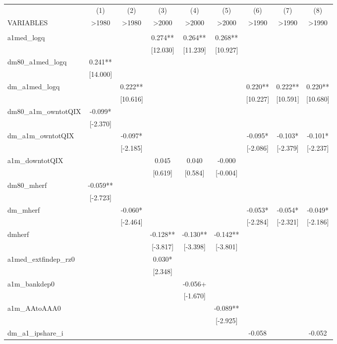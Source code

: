 \documentclass[]{article}
\begin{document}
\begin{tabular}{lcccccccc} \hline
 & (1) & (2) & (3) & (4) & (5) & (6) & (7) & (8) \\
VARIABLES & >1980 & >1980 & >2000 & >2000 & >2000 & >1990 & >1990 & >1990 \\ \hline
 &  &  &  &  &  &  &  &  \\
a1med\_logq &  &  & 0.274** & 0.264** & 0.268** &  &  &  \\
 &  &  & [12.030] & [11.239] & [10.927] &  &  &  \\
dm80\_a1med\_logq & 0.241** &  &  &  &  &  &  &  \\
 & [14.000] &  &  &  &  &  &  &  \\
dm\_a1med\_logq &  & 0.222** &  &  &  & 0.220** & 0.222** & 0.220** \\
 &  & [10.616] &  &  &  & [10.227] & [10.591] & [10.680] \\
dm80\_a1m\_owntotQIX & -0.099* &  &  &  &  &  &  &  \\
 & [-2.370] &  &  &  &  &  &  &  \\
dm\_a1m\_owntotQIX &  & -0.097* &  &  &  & -0.095* & -0.103* & -0.101* \\
 &  & [-2.185] &  &  &  & [-2.086] & [-2.379] & [-2.237] \\
a1m\_downtotQIX &  &  & 0.045 & 0.040 & -0.000 &  &  &  \\
 &  &  & [0.619] & [0.584] & [-0.004] &  &  &  \\
dm80\_mherf & -0.059** &  &  &  &  &  &  &  \\
 & [-2.723] &  &  &  &  &  &  &  \\
dm\_mherf &  & -0.060* &  &  &  & -0.053* & -0.054* & -0.049* \\
 &  & [-2.464] &  &  &  & [-2.284] & [-2.321] & [-2.186] \\
dmherf &  &  & -0.128** & -0.130** & -0.142** &  &  &  \\
 &  &  & [-3.817] & [-3.398] & [-3.801] &  &  &  \\
a1med\_extfindep\_rz0 &  &  & 0.030* &  &  &  &  &  \\
 &  &  & [2.348] &  &  &  &  &  \\
a1m\_bankdep0 &  &  &  & -0.056+ &  &  &  &  \\
 &  &  &  & [-1.670] &  &  &  &  \\
a1m\_AAtoAAA0 &  &  &  &  & -0.089** &  &  &  \\
 &  &  &  &  & [-2.925] &  &  &  \\
dm\_a1\_ipshare\_i &  &  &  &  &  & -0.058 &  & -0.052 \\

\end{tabular}
\end{document}
